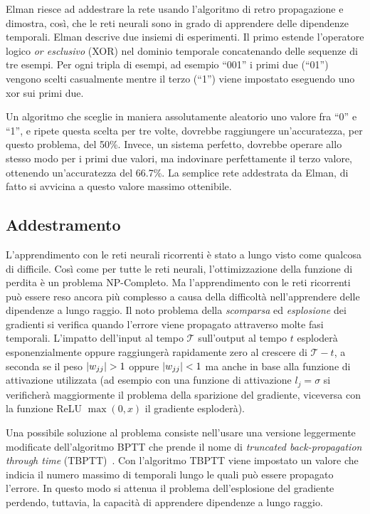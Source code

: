 Elman riesce ad addestrare la rete usando l'algoritmo di retro propagazione e
dimostra, cos\`i, che le reti neurali sono in grado di apprendere delle dipendenze
temporali. Elman descrive due insiemi di esperimenti. Il primo estende l'operatore
logico \emph{or esclusivo} (XOR) nel dominio temporale concatenando delle sequenze
di tre esempi. Per ogni tripla di esempi, ad esempio ``001'' i primi due (``01'')
vengono scelti casualmente mentre il terzo (``1'') viene impostato eseguendo uno
xor sui primi due.

Un algoritmo che sceglie in maniera assolutamente aleatorio uno valore fra ``0''
e ``1'', e ripete questa scelta per tre volte, dovrebbe raggiungere un'accuratezza,
per questo problema, del 50\%. Invece, un sistema perfetto, dovrebbe operare allo
stesso modo per i primi due valori, ma indovinare perfettamente il terzo valore,
ottenendo un'accuratezza del 66.7\%. La semplice rete addestrata da Elman, di fatto
si avvicina a questo valore massimo ottenibile.

\subsection{Addestramento}
L'apprendimento con le reti neurali ricorrenti \`e stato a lungo visto come
qualcosa di difficile. Cos\`i come per tutte le reti neurali, l'ottimizzazione
della funzione di perdita \`e un problema NP-Completo. Ma l'apprendimento con le
reti ricorrenti pu\`o essere reso ancora pi\`u complesso a causa della difficolt\`a
nell'apprendere delle dipendenze a lungo raggio. Il noto problema della
\emph{scomparsa} ed \emph{esplosione} dei gradienti si verifica quando l'errore
viene propagato attraverso molte fasi temporali. L'impatto dell'input al tempo
$\mathcal{T}$ sull'output al tempo $t$ esploder\`a esponenzialmente oppure
raggiunger\`a rapidamente zero al crescere di $\mathcal{T} - t$, a seconda se il
peso $\lvert w_{jj}\rvert>1$ oppure $\lvert w_{jj}\rvert<1$ ma anche in base alla funzione di
attivazione utilizzata (ad esempio con una funzione di attivazione $l_j = \sigma$
si verificher\`a maggiormente il problema della sparizione del gradiente, viceversa
con la funzione ReLU $\operatorname{max}(0, x)$ il gradiente esploder\`a).

Una possibile soluzione al problema consiste nell'usare una versione leggermente
modificate dell'algoritmo BPTT che prende il nome di \emph{truncated back-propagation
through time} (TBPTT)~\cite{Williams:1989}. Con l'algoritmo TBPTT viene impostato
un valore che indicia il numero massimo di temporali lungo le quali pu\`o essere
propagato l'errore. In questo modo si attenua il problema dell'esplosione del
gradiente perdendo, tuttavia, la capacit\`a di apprendere dipendenze a lungo raggio.

